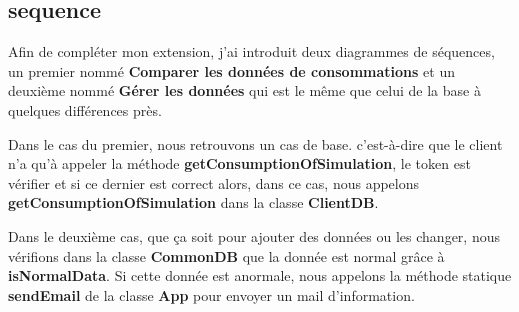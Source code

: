 \subsection{sequence}

\begin{flushleft}
Afin de compléter mon extension, j'ai introduit deux diagrammes de séquences, un premier nommé \textbf{Comparer les données de consommations} et un deuxième nommé \textbf{Gérer les données} qui est le même que celui de la base à quelques différences près.
\end{flushleft}

\begin{flushleft}
Dans le cas du premier, nous retrouvons un cas de base. c'est-à-dire que le client n'a qu'à appeler la méthode \textbf{getConsumptionOfSimulation}, le token est vérifier et si ce dernier est correct alors, dans ce cas, nous appelons \textbf{getConsumptionOfSimulation} dans la classe \textbf{ClientDB}.
\end{flushleft}



\begin{flushleft}
Dans le deuxième cas, que ça soit pour ajouter des données ou les changer, nous vérifions dans la classe \textbf{CommonDB} que la donnée est normal grâce à \textbf{isNormalData}. Si cette donnée est anormale, nous appelons la méthode statique \textbf{sendEmail} de la classe \textbf{App} pour envoyer un mail d'information.
\end{flushleft}


